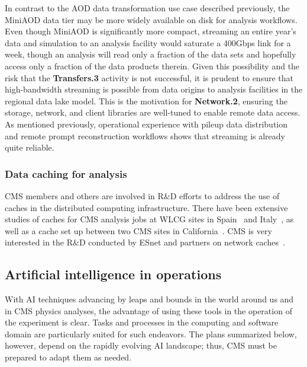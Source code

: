 In contrast to the \gls{AOD} data transformation use case described previously, the MiniAOD data tier may be more widely available on disk for analysis workflows. Even though MiniAOD is significantly more compact, streaming an entire year's data and simulation to an analysis facility would saturate a 400\unit{Gbps} link for a week, though an analysis will read only a fraction of the data sets and hopefully access only a fraction of the data products therein. Given this possibility and the risk that the \textbf{Transfers.3} activity is not successful, it is prudent to ensure that high-bandwidth streaming is possible from data origins to analysis facilities in the regional data lake model. This is the motivation for \textbf{Network.2}, ensuring the storage, network, and client libraries are well-tuned to enable remote data access. As mentioned previously, operational experience with pileup data distribution and remote prompt reconstruction workflows shows that streaming is already quite reliable.

\subsubsection{Data caching for analysis}

CMS members and others are involved in R\&D efforts to address the use of caches in the distributed computing infrastructure. There have been extensive studies of caches for CMS analysis jobs at \gls{WLCG} sites in Spain~\cite{cache-ES,Dengra:2023ytr} and Italy~\cite{Tedeschi:2022swr}, as well as a cache set up between two CMS \TierTwo sites in California~\cite{cache-CA,Sim_2023}. CMS is very interested in the R\&D conducted by ESnet and partners on network caches~\cite{cache-ESnet}.


\subsection{Artificial intelligence in operations}
\label{sec:infrastructure-ai}

With \gls{AI} techniques advancing by leaps and bounds in the world around us and in CMS physics analyses, the advantage of using these tools in the operation of the experiment is clear. Tasks and processes in the computing and software domain are particularly suited for such endeavors. The plans summarized below, however, depend on the rapidly evolving \gls{AI} landscape; thus, CMS must be prepared to adapt them as needed.

